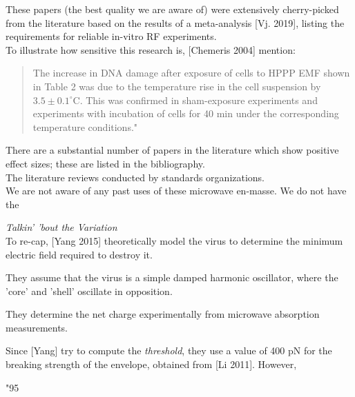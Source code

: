 \documentclass[fleqn,10pt]{article}
\begin{document}
\begin{autem}

These papers (the best quality we are aware of) were extensively cherry-picked from the literature based on the results of a meta-analysis [Vj. 2019], listing the requirements for reliable in-vitro RF experiments.\\

To illustrate how sensitive this research is, [Chemeris 2004] mention:

\begin{quote}

The increase in DNA damage after exposure of cells to HPPP EMF shown in Table 2 was due to the temperature rise in the cell suspension by $3.5\pm0.1^{\circ}  $C. This was confirmed in sham-exposure experiments and experiments with incubation of cells for 40 min under the corresponding temperature conditions."

\end{quote}

There are a substantial number of papers in the literature which show positive effect sizes; these are listed in the bibliography. \\

The literature reviews conducted by standards organizations.\\

We are not aware of any past uses of these microwave en-masse. We do not have the 

\end{autem}

\cite{POLAROGRAPHICOXYGENSENSORS}



\clearpage
{\Large \it Talkin' 'bout the Variation}\\

To re-cap, [Yang 2015] theoretically model the virus to determine the minimum electric field required to destroy it. 

They assume that the virus is a simple damped harmonic oscillator, where the 'core' and 'shell' oscillate in opposition. 

They determine the net charge experimentally from microwave absorption measurements.

Since [Yang] try to compute the {\it threshold}, they use a value of 400 pN for the breaking strength of the envelope, obtained from [Li 2011]. However,  

"95%
\end{document}
